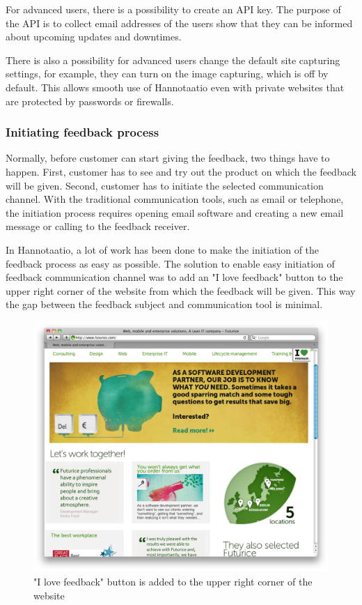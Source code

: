 \documentclass[english,12pt,a4paper,pdftex]{article}
\begin{document}
For advanced users, there is a possibility to create an \ac{API} key. The purpose of the \ac{API} is to collect email addresses of the users show that they can be informed about upcoming updates and downtimes.

There is also a possibility for advanced users change the default site capturing settings, for example, they can turn on the image capturing, which is off by default. This allows smooth use of Hannotaatio even with private websites that are protected by passwords or firewalls.

\subsubsection{Initiating feedback process}

Normally, before customer can start giving the feedback, two things have to happen. First, customer has to see and try out the product on which the feedback will be given. Second, customer has to initiate the selected communication channel. With the traditional communication tools, such as email or telephone, the initiation process requires opening email software and creating a new email message or calling to the feedback receiver.

In Hannotaatio, a lot of work has been done to make the initiation of the feedback process as easy as possible. The solution to enable easy initiation of feedback communication channel was to add an "I love feedback" button to the upper right corner of the website from which the feedback will be given. This way the gap between the feedback subject and communication tool is minimal.

\begin{figure}[htb]
\begin{center}
\includegraphics[width=1.0\textwidth]{initiate_feedback.png}
\end{center}
\caption{"I love feedback" button is added to the upper right corner of the website}
\end{figure}
\end{document}

